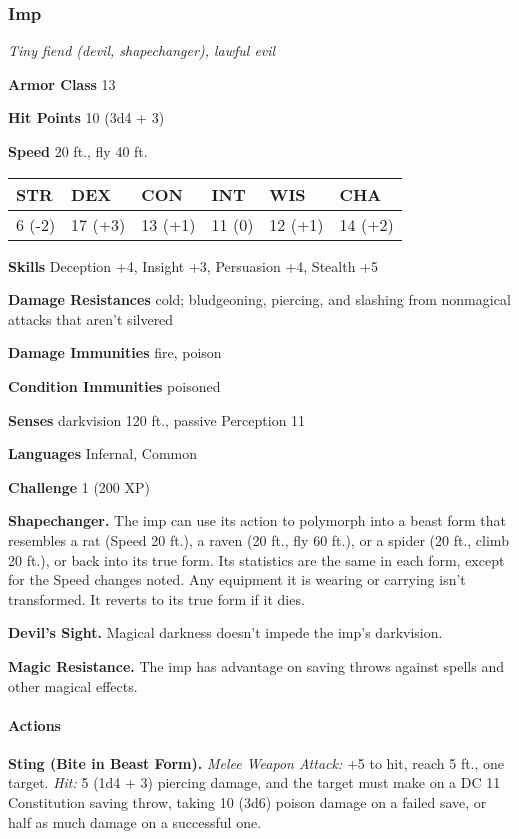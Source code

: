 \documentclass[
]{article}
\begin{document}
\hypertarget{imp}{%
\subsubsection{Imp}\label{imp}}

\emph{Tiny fiend (devil, shapechanger), lawful evil}

\textbf{Armor Class} 13

\textbf{Hit Points} 10 (3d4 + 3)

\textbf{Speed} 20 ft., fly 40 ft.

\begin{longtable}[]{@{}llllll@{}}
\toprule
STR & DEX & CON & INT & WIS & CHA\tabularnewline
\midrule
\endhead
6 (-2) & 17 (+3) & 13 (+1) & 11 (0) & 12 (+1) & 14 (+2)\tabularnewline
\bottomrule
\end{longtable}

\textbf{Skills} Deception +4, Insight +3, Persuasion +4, Stealth +5

\textbf{Damage Resistances} cold; bludgeoning, piercing, and slashing
from nonmagical attacks that aren't silvered

\textbf{Damage Immunities} fire, poison

\textbf{Condition Immunities} poisoned

\textbf{Senses} darkvision 120 ft., passive Perception 11

\textbf{Languages} Infernal, Common

\textbf{Challenge} 1 (200 XP)

\textbf{Shapechanger.} The imp can use its action to polymorph into a
beast form that resembles a rat (Speed 20 ft.), a raven (20 ft., fly 60
ft.), or a spider (20 ft., climb 20 ft.), or back into its true form.
Its statistics are the same in each form, except for the Speed changes
noted. Any equipment it is wearing or carrying isn't transformed. It
reverts to its true form if it dies.

\textbf{Devil's Sight.} Magical darkness doesn't impede the imp's
darkvision.

\textbf{Magic Resistance.} The imp has advantage on saving throws
against spells and other magical effects.

\hypertarget{actions-16}{%
\paragraph{Actions}\label{actions-16}}

\textbf{Sting (Bite in Beast Form).} \emph{Melee Weapon Attack:} +5 to
hit, reach 5 ft., one target. \emph{Hit:} 5 (1d4 + 3) piercing damage,
and the target must make on a DC 11 Constitution saving throw, taking 10
(3d6) poison damage on a failed save, or half as much damage on a
successful one.
\end{document}
